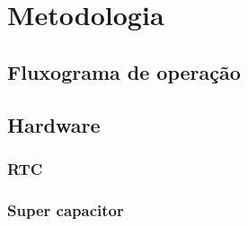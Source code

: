 \chapter{Metodologia}



\section{Fluxograma de operação}


\section{Hardware}


\subsection{RTC}

\subsection{Super capacitor}



